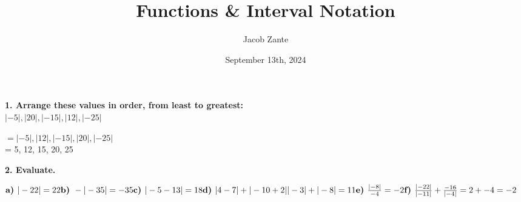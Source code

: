 \documentclass[14pt, a4paper]{extarticle}
\title{Functions \& Interval Notation}
\author{Jacob Zante}
\date{September 13th, 2024}
\begin{document}
\maketitle
\setlength{\parindent}{0pt}



\textbf{1. Arrange these values in order, from least to greatest: } \\
\textbf{$|-5|, |20|, |-15|, |12|, |-25|$} \\
\begin{adjustwidth}{1cm}{0pt}
    $= |-5|, |12|, |-15|, |20|, |-25|$ \\
    = 5, 12, 15, 20, 25 \\
\end{adjustwidth}

\textbf{2. Evaluate.} \\
\begin{adjustwidth}{1cm}{0pt}
    \begin{math}
        \textbf{a) } |-22| \\
        = 22 \\
        \\
        \textbf{b) } -|-35| \\
        = -35 \\
        \\
        \textbf{c) } |-5 - 13| \\
        = 18 \\
        \\
        \textbf{d) } |4 - 7| + |-10 + 2| \\
        |-3| + |-8| \\
        = 11 \\
        \\
        \textbf{e) } \frac{|-8|}{-4} \\
        = -2 \\
        \\
        \textbf{f) } \frac{|-22|}{|-11|} + \frac{-16}{|-4|} \\
        = 2 + -4 \\
        = -2 \\
    \end{math}
\end{adjustwidth}
\end{document}
